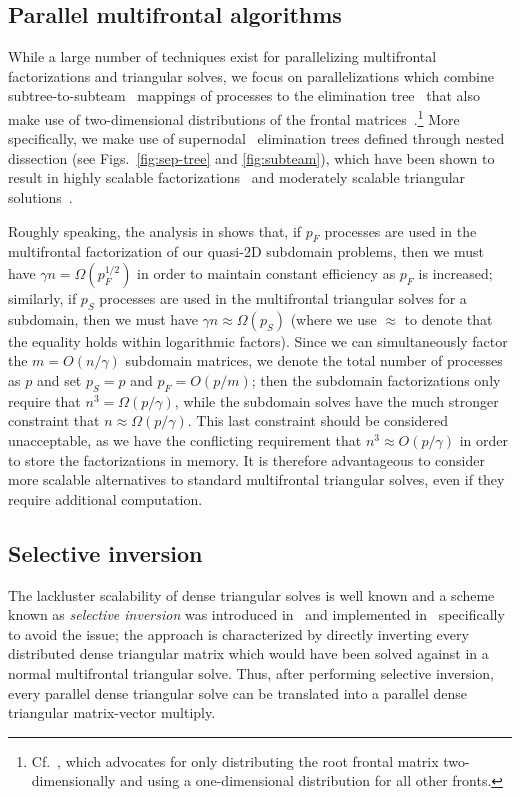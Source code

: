 \subsection{Parallel multifrontal algorithms}
\label{subsection:parallel-multifrontal}
While a large number of techniques exist for parallelizing multifrontal
factorizations and triangular solves, we focus on parallelizations 
which combine subtree-to-subteam~\cite{GeorgeLiuNg-subtree} mappings of 
processes to the elimination tree~\cite{Schreiber-etree} that also make use of 
two-dimensional distributions of the frontal 
matrices~\cite{Schreiber-scalability}.\footnote{Cf.~\cite{Amestoy-MUMPS}, which
advocates for only distributing the root frontal matrix two-dimensionally and 
using a one-dimensional distribution for all other fronts.}
More specifically, we make use of supernodal~\cite{Ashcraft-progress} 
elimination trees defined through nested dissection
(see Figs.~\ref{fig:sep-tree} and \ref{fig:subteam}), which have been shown to 
result in highly scalable 
factorizations~\cite{GuptaKarypisKumar-scalable,GuptaKoricGeorge-massive} and 
moderately scalable triangular solutions~\cite{JoshiGuptaKarypisKumar-2d}. 




Roughly speaking, the analysis in \cite{JoshiGuptaKarypisKumar-2d} shows that, 
if $p_F$ processes are used in the multifrontal factorization of our quasi-2D 
subdomain problems, then we must have $\gamma n=\Omega(p_F^{1/2})$ in order to 
maintain constant efficiency as $p_F$ is increased; similarly, if $p_S$ 
processes are used in the multifrontal triangular solves for a subdomain, 
then we must have $\gamma n\approx \Omega(p_S)$
(where we use $\approx$ to denote that the equality holds within logarithmic 
factors). 
Since we can simultaneously factor the $m=O(n/\gamma)$ subdomain 
matrices, we denote the total number of processes as $p$ and set 
$p_S=p$ and $p_F=O(p/m)$; then the subdomain factorizations only require
that $n^3=\Omega(p/\gamma)$, while the subdomain solves have the 
much stronger constraint that $n \approx \Omega(p/\gamma)$. 
This last constraint should be considered unacceptable, as we have the 
conflicting requirement that $n^3 \approx O(p/\gamma)$ in 
order to store the factorizations in memory. It is therefore advantageous to 
consider more scalable alternatives to standard multifrontal triangular solves, 
even if they require additional computation.

\subsection{Selective inversion}
\label{subsection:selective-inversion}
The lackluster scalability of dense triangular solves is well known and
a scheme known as {\em selective inversion} was introduced 
in~\cite{Raghavan-invert} and implemented in~\cite{Raghavan-dscpack} 
specifically to avoid the issue; the approach is 
characterized by directly inverting every distributed dense triangular matrix 
which would have been solved against in a normal multifrontal triangular solve. Thus, after performing selective inversion, every parallel dense triangular 
solve can be translated into a parallel dense triangular matrix-vector multiply.


